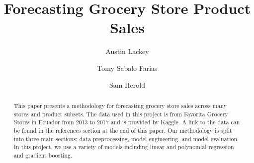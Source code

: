 \documentclass[12pt]{article}
\title{Forecasting Grocery Store Product Sales}
\author{Austin Lackey}
\author{Tomy Sabalo Farias}
\author{Sam Herold}
\affil{DSCI 478, Colorado State University}
\begin{document}
\maketitle

\begin{abstract}
This paper presents a methodology for forecasting grocery store sales across many stores and product subsets.
The data used in this project is from Favorita Grocery Stores in Ecuador from 2013 to 2017 and is provided by Kaggle.
A link to the data can be found in the references section at the end of this paper.
Our methodology is split into three main sections: data preprocessing, model engineering, and model evaluation.
In this project, we use a variety of models including linear and polynomial regression and gradient boosting.
\end{abstract}
\end{document}
